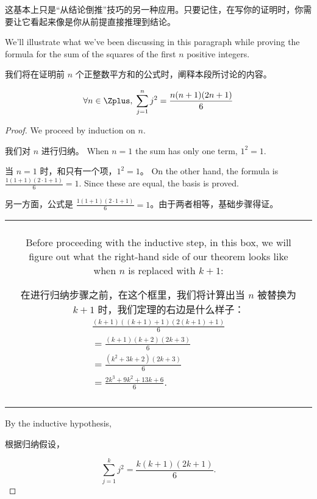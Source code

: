 这基本上只是“从结论倒推”技巧的另一种应用。只要记住，在写你的证明时，你需要让它看起来像是你从前提直接推理到结论。

We'll illustrate
what we've been discussing in this paragraph while proving
the formula for the sum of the squares of the first $n$ positive integers.

我们将在证明前 $n$ 个正整数平方和的公式时，阐释本段所讨论的内容。
\begin{thm}
\[ \forall n \in \Zplus, \; \sum_{j=1}^n j^2 = \frac{n(n+1)(2n+1)}{6} \]
\end{thm}

\begin{proof}
We proceed by induction on $n$.

我们对 $n$ 进行归纳。
 When $n = 1$ the sum has only one term, $1^2 = 1$.

当 $n = 1$ 时，和只有一个项，$1^2 = 1$。
On the other hand, the formula is 
$\displaystyle \frac{1(1+1)(2\cdot 1+1)}{6} = 1$.  Since these are equal, the 
basis is proved.

另一方面，公式是 $\displaystyle \frac{1(1+1)(2\cdot 1+1)}{6} = 1$。由于两者相等，基础步骤得证。


\begin{tabular}{|ccc|} \hline
 & &\\
 & \begin{minipage}{4 in} 
Before proceeding with the inductive step, in this box, we will
figure out what the right-hand side of our theorem looks like 
when $n$ is replaced with $k+1$:

在进行归纳步骤之前，在这个框里，我们将计算出当 $n$ 被替换为 $k+1$ 时，我们定理的右边是什么样子：
\begin{gather*}
 \frac{(k+1)((k+1)+1)(2(k+1)+1)}{6} \\
= \frac{(k+1)(k+2)(2k+3)}{6} \\
= \frac{(k^2+3k+2)(2k+3)}{6} \\
= \frac{2k^3+9k^2+13k+6}{6}.
\end{gather*}
\end{minipage} & \\ 
 & & \\ \hline
\end{tabular}


By the inductive hypothesis,

根据归纳假设，

\[ \sum_{j=1}^k j^2 = \frac{k(k+1)(2k+1)}{6}.
\]


\end{proof}
